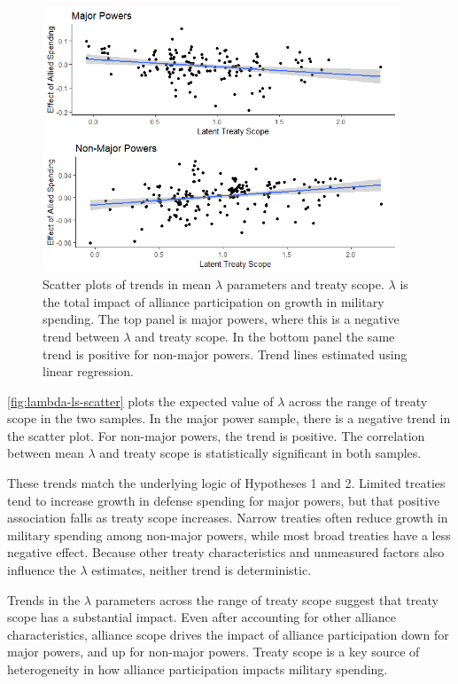 \documentclass[12pt]{article}
\begin{document}
\begin{figure}[htbp]
	\centering
		\includegraphics[width=0.95\textwidth]{../figures/lambda-ls-scatter.png}
	\caption{Scatter plots of trends in mean $\lambda$ parameters and treaty scope. $\lambda$ is the total impact of alliance participation on growth in military spending. The top panel is major powers, where this is a negative trend between $\lambda$ and treaty scope. In the bottom panel the same trend is positive for non-major powers. Trend lines estimated using linear regression.}
	\label{fig:lambda-ls-scatter}
\end{figure}


\autoref{fig:lambda-ls-scatter} plots the expected value of $\lambda$ across the range of treaty scope in the two samples. 
In the major power sample, there is a negative trend in the scatter plot.
For non-major powers, the trend is positive.
The correlation between mean $\lambda$ and treaty scope is statistically significant in both samples. 


These trends match the underlying logic of Hypotheses 1 and 2. 
Limited treaties tend to increase growth in defense spending for major powers, but that positive association falls as treaty scope increases. 
Narrow treaties often reduce growth in military spending among non-major powers, while most broad treaties have a less negative effect. 
Because other treaty characteristics and unmeasured factors also influence the $\lambda$ estimates, neither trend is deterministic. 


Trends in the $\lambda$ parameters across the range of treaty scope suggest that treaty scope has a substantial impact. 
Even after accounting for other alliance characteristics, alliance scope drives the impact of alliance participation down for major powers, and up for non-major powers. 
Treaty scope is a key source of heterogeneity in how alliance participation impacts military spending. 
\end{document}
